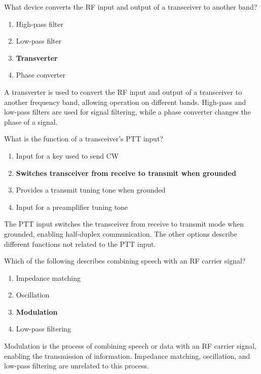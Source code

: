 
\begin{tcolorbox}[colback=gray!10!white,colframe=black!75!black,title={T7A06}]
    What device converts the RF input and output of a transceiver to another band?
    \begin{enumerate}[label=\Alph*,noitemsep]
        \item High-pass filter
        \item Low-pass filter
        \item \textbf{Transverter}
        \item Phase converter
    \end{enumerate}
\end{tcolorbox}
A transverter is used to convert the RF input and output of a transceiver to another frequency band, allowing operation on different bands. High-pass and low-pass filters are used for signal filtering, while a phase converter changes the phase of a signal.


\begin{tcolorbox}[colback=gray!10!white,colframe=black!75!black,title={T7A07}]
    What is the function of a transceiver’s PTT input?
    \begin{enumerate}[label=\Alph*,noitemsep]
        \item Input for a key used to send CW
        \item \textbf{Switches transceiver from receive to transmit when grounded}
        \item Provides a transmit tuning tone when grounded
        \item Input for a preamplifier tuning tone
    \end{enumerate}
\end{tcolorbox}
The PTT input switches the transceiver from receive to transmit mode when grounded, enabling half-duplex communication. The other options describe different functions not related to the PTT input.


\begin{tcolorbox}[colback=gray!10!white,colframe=black!75!black,title={T7A08}]
    Which of the following describes combining speech with an RF carrier signal?
    \begin{enumerate}[label=\Alph*,noitemsep]
        \item Impedance matching
        \item Oscillation
        \item \textbf{Modulation}
        \item Low-pass filtering
    \end{enumerate}
\end{tcolorbox}
Modulation is the process of combining speech or data with an RF carrier signal, enabling the transmission of information. Impedance matching, oscillation, and low-pass filtering are unrelated to this process.

